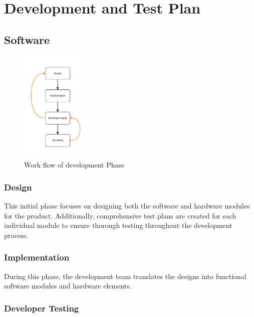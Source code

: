 \documentclass[a4paper,12pt]{article}
\begin{document}
	
	\newpage
	\section{Development and Test Plan}
	
	\subsection{Software }
	
	\begin{figure}[h]
		\centering
		\includegraphics[width=0.3\textwidth]{d-t} %
		\caption{Work flow of development Phase}
		\label{fig:Work flow of development Phase}
	\end{figure}
	
	 \subsubsection{Design}
	
	This initial phase focuses on designing both the software and hardware modules for the product. Additionally, comprehensive test plans are created for each individual module to ensure thorough testing throughout the development process.
	
	 \subsubsection{Implementation}
	
	During this phase, the development team translates the designs into functional software modules and hardware elements.
	
 \subsubsection{Developer Testing}
	
\end{document}
